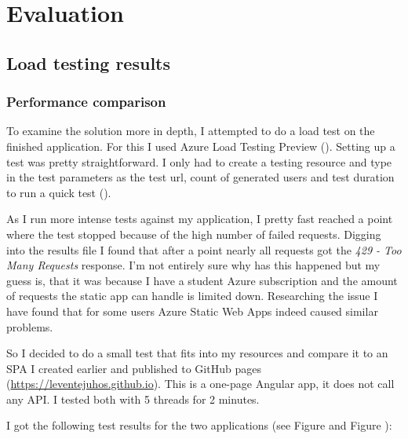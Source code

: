 \chapter{Evaluation}\label{sect:Comparison}\label{Ch6}
\section{Load testing results}
\subsection{Performance comparison}
To examine the solution more in depth, I attempted to do a load test on the finished application. For this I used Azure Load Testing Preview (\cite{LoadtestOverview}). Setting up a test was pretty straightforward. I only had to create a testing resource and type in the test parameters as the test url, count of generated users and test duration to run a quick test (\cite{LoadtestQuickstart}). 

As I run more intense tests against my application, I pretty fast reached a point where the test stopped because of the high number of failed requests. Digging into the results file I found that after a point nearly all requests got the \emph{429 - Too Many Requests} response. I'm not entirely sure why has this happened but my guess is, that it was because I have a student Azure subscription and the amount of requests the static app can handle is limited down. Researching the issue I have found that for some users Azure Static Web Apps indeed caused similar problems.

So I decided to do a small test that fits into my resources and compare it to an SPA I created earlier and published to GitHub pages (\url{https://leventejuhos.github.io}). This is a one-page Angular app, it does not call any API. I tested both with 5 threads for 2 minutes.

I got the following test results for the two applications (see Figure  and Figure ):

